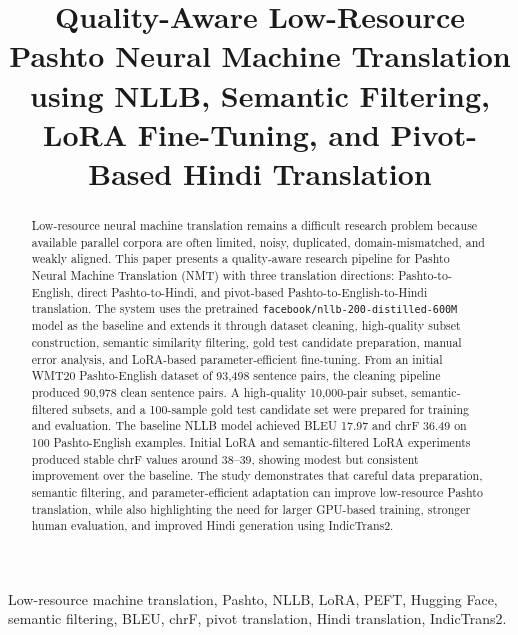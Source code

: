 \documentclass[conference]{IEEEtran}
\begin{document}
\title{
Quality-Aware Low-Resource Pashto Neural Machine Translation using NLLB, Semantic Filtering, LoRA Fine-Tuning, and Pivot-Based Hindi Translation
}

\author{
}

\maketitle

\begin{abstract}
Low-resource neural machine translation remains a difficult research problem because available parallel corpora are often limited, noisy, duplicated, domain-mismatched, and weakly aligned. This paper presents a quality-aware research pipeline for Pashto Neural Machine Translation (NMT) with three translation directions: Pashto-to-English, direct Pashto-to-Hindi, and pivot-based Pashto-to-English-to-Hindi translation. The system uses the pretrained \texttt{facebook/nllb-200-distilled-600M} model as the baseline and extends it through dataset cleaning, high-quality subset construction, semantic similarity filtering, gold test candidate preparation, manual error analysis, and LoRA-based parameter-efficient fine-tuning. From an initial WMT20 Pashto-English dataset of 93,498 sentence pairs, the cleaning pipeline produced 90,978 clean sentence pairs. A high-quality 10,000-pair subset, semantic-filtered subsets, and a 100-sample gold test candidate set were prepared for training and evaluation. The baseline NLLB model achieved BLEU 17.97 and chrF 36.49 on 100 Pashto-English examples. Initial LoRA and semantic-filtered LoRA experiments produced stable chrF values around 38--39, showing modest but consistent improvement over the baseline. The study demonstrates that careful data preparation, semantic filtering, and parameter-efficient adaptation can improve low-resource Pashto translation, while also highlighting the need for larger GPU-based training, stronger human evaluation, and improved Hindi generation using IndicTrans2.
\end{abstract}

\begin{IEEEkeywords}
Low-resource machine translation, Pashto, NLLB, LoRA, PEFT, Hugging Face, semantic filtering, BLEU, chrF, pivot translation, Hindi translation, IndicTrans2.
\end{IEEEkeywords}
\end{document}
